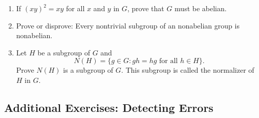 {\begin{enumerate}
 
\item
If $(xy)^2 = xy$ for all $x$ and $y$ in $G$, prove that $G$ must be
abelian.
 
 
\item
Prove or disprove: Every nontrivial subgroup of an nonabelian group is
nonabelian.
 
 
\item
Let $H$ be a subgroup of $G$ and
\[
N(H) = \{ g \in G : gh = hg \mbox{ for all $h \in H$}  \}.
\]
Prove $N(H)$ is a subgroup of $G$.  This subgroup is called the {\bfi
normalizer\/} of $H$ in $G$. 
 
\end{enumerate}
}
 
 
\subsection*{Additional Exercises: Detecting Errors}
 
